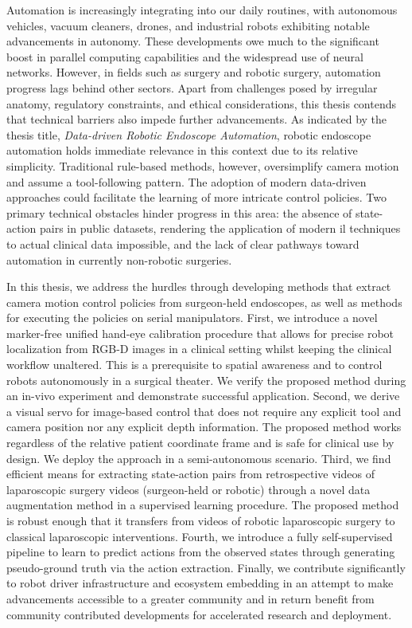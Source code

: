 Automation is increasingly integrating into our daily routines, with autonomous vehicles, vacuum cleaners, drones, and industrial robots exhibiting notable advancements in autonomy. These developments owe much to the significant boost in parallel computing capabilities and the widespread use of neural networks. However, in fields such as surgery and robotic surgery, automation progress lags behind other sectors. Apart from challenges posed by irregular anatomy, regulatory constraints, and ethical considerations, this thesis contends that technical barriers also impede further advancements. As indicated by the thesis title, \textit{Data-driven Robotic Endoscope Automation}, robotic endoscope automation holds immediate relevance in this context due to its relative simplicity. Traditional rule-based methods, however, oversimplify camera motion and assume a tool-following pattern. The adoption of modern data-driven approaches could facilitate the learning of more intricate control policies. Two primary technical obstacles hinder progress in this area: the absence of state-action pairs in public datasets, rendering the application of modern \gls{il} techniques to actual clinical data impossible, and the lack of clear pathways toward automation in currently non-robotic surgeries.

In this thesis, we address the hurdles through developing methods that extract camera motion control policies from surgeon-held endoscopes, as well as methods for executing the policies on serial manipulators. First, we introduce a novel marker-free unified hand-eye calibration procedure that allows for precise robot localization from RGB-D images in a clinical setting whilst keeping the clinical workflow unaltered. This is a prerequisite to spatial awareness and to control robots autonomously in a surgical theater. We verify the proposed method during an in-vivo experiment and demonstrate successful application. Second, we derive a visual servo for image-based control that does not require any explicit tool and camera position nor any explicit depth information. The proposed method works regardless of the relative patient coordinate frame and is safe for clinical use by design. We deploy the approach in a semi-autonomous scenario.
Third, we find efficient means for extracting state-action pairs from retrospective videos of laparoscopic surgery videos (surgeon-held or robotic) through a novel data augmentation method in a supervised learning procedure. The proposed method is
robust enough
that it transfers from videos of robotic laparoscopic surgery to classical laparoscopic interventions. Fourth, we introduce a fully self-supervised pipeline to learn to predict actions from the observed states through generating pseudo-ground truth via the action extraction. Finally, we contribute significantly to robot driver infrastructure and ecosystem embedding in an attempt to make advancements accessible to a greater community and in return benefit from community contributed developments for accelerated research and deployment.

